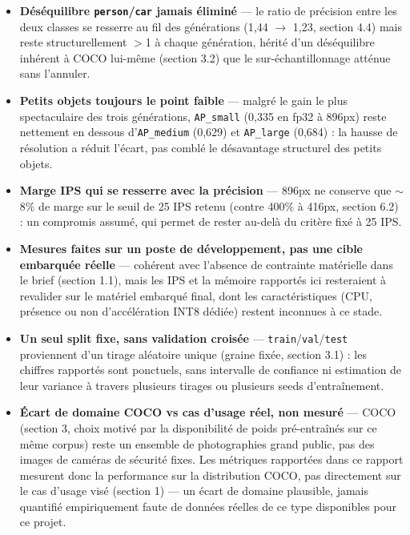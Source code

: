 \documentclass[11pt,a4paper]{article}
\begin{document}
    \begin{itemize}[leftmargin=1.5em]
      \item \textbf{Déséquilibre \texttt{person}/\texttt{car} jamais éliminé}
        --- le ratio de précision entre les deux classes se resserre au fil
        des générations (1,44 $\to$ 1,23, section 4.4) mais reste
        structurellement $>$1 à chaque génération, hérité d'un déséquilibre
        inhérent à COCO lui-même (section 3.2) que le sur-échantillonnage
        atténue sans l'annuler.
      \item \textbf{Petits objets toujours le point faible} --- malgré le
        gain le plus spectaculaire des trois générations,
        \texttt{AP\_small} (0,335 en fp32 à 896px) reste nettement en
        dessous d'\texttt{AP\_medium} (0,629) et \texttt{AP\_large} (0,684)
        : la hausse de résolution a réduit l'écart, pas comblé le désavantage
        structurel des petits objets.
      \item \textbf{Marge IPS qui se resserre avec la précision} --- 896px
        ne conserve que $\sim$8\% de marge sur le seuil de 25 IPS retenu
        (contre 400\% à 416px, section 6.2) : un compromis assumé, qui permet de rester au-delà du critère fixé à 25 IPS.
      \item \textbf{Mesures faites sur un poste de développement, pas une
        cible embarquée réelle} --- cohérent avec l'absence de contrainte
        matérielle dans le brief (section 1.1), mais les IPS et la mémoire
        rapportés ici resteraient à revalider sur le matériel embarqué
        final, dont les caractéristiques (CPU, présence ou non
        d'accélération INT8 dédiée) restent inconnues à ce stade.
      \item \textbf{Un seul split fixe, sans validation croisée} ---
        \texttt{train}/\texttt{val}/\texttt{test} proviennent d'un tirage
        aléatoire unique (graine fixée, section 3.1) : les chiffres rapportés
        sont ponctuels, sans intervalle de confiance ni estimation de leur
        variance à travers plusieurs tirages ou plusieurs seeds
        d'entraînement.
      \item \textbf{Écart de domaine COCO vs cas d'usage réel, non mesuré}
        --- COCO (section 3, choix motivé par la disponibilité de poids
        pré-entraînés sur ce même corpus) reste un ensemble de
        photographies grand public, pas des images de caméras de sécurité
        fixes. Les métriques rapportées dans ce rapport mesurent donc la
        performance sur la distribution COCO, pas directement sur le cas
        d'usage visé (section 1) --- un écart de domaine plausible, jamais
        quantifié empiriquement faute de données réelles de ce type
        disponibles pour ce projet.
    \end{itemize}
    
\end{document}
